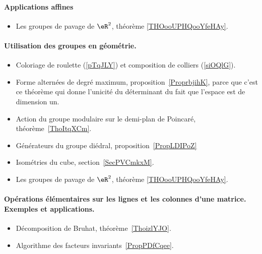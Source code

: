 \paragraph{Applications affines}
\begin{itemize}
    \item Les groupes de pavage de \( \eR^2\), théorème \ref{THOooUPHQooYfeHAy}.
\end{itemize}
\paragraph{Utilisation des groupes en géométrie.}
\begin{itemize}
    \item Coloriage de roulette (\ref{pTqJLY}) et composition de colliers (\ref{siOQlG}).
    \item Forme alternées de degré maximum, proposition~\ref{ProprbjihK}, parce que c'est ce théorème qui donne l'unicité du déterminant du fait que l'espace est de dimension un.
    \item Action du groupe modulaire sur le demi-plan de Poincaré, théorème~\ref{ThoItqXCm}.
    \item Générateurs du groupe diédral, proposition~\ref{PropLDIPoZ}
    \item Isométries du cube, section~\ref{SecPVCmkxM}.
    \item Les groupes de pavage de \( \eR^2\), théorème \ref{THOooUPHQooYfeHAy}.
\end{itemize}




\paragraph{Opérations élémentaires sur les lignes et les colonnes d’une matrice. Exemples et applications.}
\begin{itemize}
    \item Décomposition de Bruhat, théorème~\ref{ThoizlYJO}.
    \item Algorithme des facteurs invariants~\ref{PropPDfCqee}.
\end{itemize}

